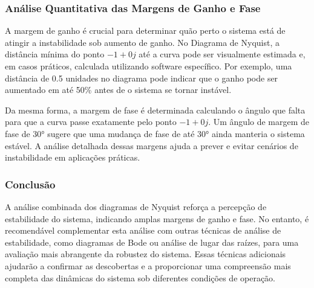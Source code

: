 \subsubsection{Análise Quantitativa das Margens de Ganho e Fase}
A margem de ganho é crucial para determinar quão perto o sistema está de atingir a instabilidade sob aumento de ganho. No Diagrama de Nyquist, a distância mínima do ponto \(-1 + 0j\) até a curva pode ser visualmente estimada e, em casos práticos, calculada utilizando software específico. Por exemplo, uma distância de 0.5 unidades no diagrama pode indicar que o ganho pode ser aumentado em até 50\% antes de o sistema se tornar instável.

Da mesma forma, a margem de fase é determinada calculando o ângulo que falta para que a curva passe exatamente pelo ponto \(-1 + 0j\). Um ângulo de margem de fase de 30° sugere que uma mudança de fase de até 30° ainda manteria o sistema estável. A análise detalhada dessas margens ajuda a prever e evitar cenários de instabilidade em aplicações práticas.

\subsubsection{Conclusão}
A análise combinada dos diagramas de Nyquist reforça a percepção de estabilidade do sistema, indicando amplas margens de ganho e fase. No entanto, é recomendável complementar esta análise com outras técnicas de análise de estabilidade, como diagramas de Bode ou análise de lugar das raízes, para uma avaliação mais abrangente da robustez do sistema. Essas técnicas adicionais ajudarão a confirmar as descobertas e a proporcionar uma compreensão mais completa das dinâmicas do sistema sob diferentes condições de operação.

